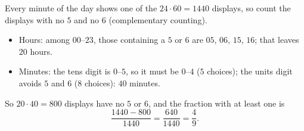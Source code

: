Every minute of the day shows one of the $24\cdot60=1440$ displays, so count the displays with no $5$ and no $6$ (complementary counting).
\begin{itemize}
\item Hours: among $00$--$23$, those containing a $5$ or $6$ are $05$, $06$, $15$, $16$; that leaves $20$ hours.
\item Minutes: the tens digit is $0$--$5$, so it must be $0$--$4$ ($5$ choices); the units digit avoids $5$ and $6$ ($8$ choices): $40$ minutes.
\end{itemize}
So $20\cdot40=800$ displays have no $5$ or $6$, and the fraction with at least one is
\[
\dfrac{1440-800}{1440}=\dfrac{640}{1440}=\boxed{\dfrac{4}{9}}.
\]
